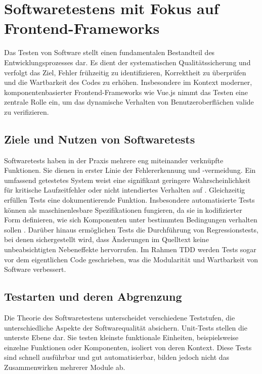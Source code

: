 \section{Softwaretestens mit Fokus auf Frontend-Frameworks}
\label{sec:testing-theorie}

Das Testen von Software stellt einen fundamentalen Bestandteil des Entwicklungsprozesses dar. Es dient der systematischen Qualitätssicherung und verfolgt das Ziel, Fehler frühzeitig zu identifizieren, Korrektheit zu überprüfen und die Wartbarkeit des Codes zu erhöhen. Insbesondere im Kontext moderner, komponentenbasierter Frontend-Frameworks wie Vue.js nimmt das Testen eine zentrale Rolle ein, um das dynamische Verhalten von Benutzeroberflächen valide zu verifizieren.

\subsection{Ziele und Nutzen von Softwaretests}

Softwaretests haben in der Praxis mehrere eng miteinander verknüpfte Funktionen. Sie dienen in erster Linie der Fehlererkennung und -vermeidung. Ein umfassend getestetes System weist eine signifikant geringere Wahrscheinlichkeit für kritische Laufzeitfehler oder nicht intendiertes Verhalten auf \cite{Myers2011}. Gleichzeitig erfüllen Tests eine dokumentierende Funktion. Insbesondere automatisierte Tests können als maschinenlesbare Spezifikationen fungieren, da sie in kodifizierter Form definieren, wie sich Komponenten unter bestimmten Bedingungen verhalten sollen \cite{Ammann2016}. Darüber hinaus ermöglichen Tests die Durchführung von Regressionstests, bei denen sichergestellt wird, dass Änderungen im Quelltext keine unbeabsichtigten Nebeneffekte hervorrufen. Im Rahmen \ac{TDD} werden Tests sogar vor dem eigentlichen Code geschrieben, was die Modularität und Wartbarkeit von Software verbessert.

\subsection{Testarten und deren Abgrenzung}

Die Theorie des Softwaretestens unterscheidet verschiedene Teststufen, die unterschiedliche Aspekte der Softwarequalität absichern. Unit-Tests stellen die unterste Ebene dar. Sie testen kleinste funktionale Einheiten, beispielsweise einzelne Funktionen oder Komponenten, isoliert von deren Kontext. Diese Tests sind schnell ausführbar und gut automatisierbar, bilden jedoch nicht das Zusammenwirken mehrerer Module ab.

